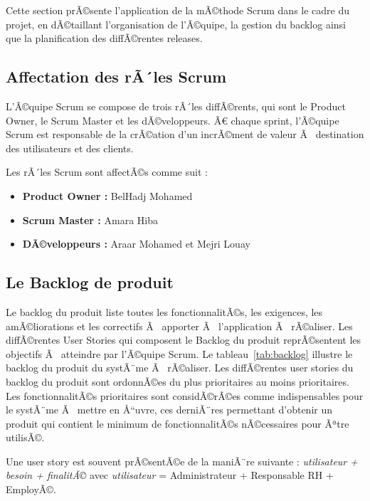 Cette section prÃ©sente l'application de la mÃ©thode Scrum dans le cadre du projet, en
dÃ©taillant l'organisation de l'Ã©quipe, la gestion du backlog ainsi que la planification
des diffÃ©rentes releases.

\subsection{Affectation des rÃ´les Scrum}

L'Ã©quipe Scrum se compose de trois rÃ´les diffÃ©rents, qui sont le Product Owner, le Scrum
Master et les dÃ©veloppeurs. Ã€ chaque sprint, l'Ã©quipe Scrum est responsable de la crÃ©ation
d'un incrÃ©ment de valeur Ã  destination des utilisateurs et des clients.

Les rÃ´les Scrum sont affectÃ©s comme suit :

\begin{itemize}
  \item \textbf{Product Owner :} BelHadj Mohamed
  \item \textbf{Scrum Master :} Amara Hiba
  \item \textbf{DÃ©veloppeurs :} Araar Mohamed et Mejri Louay
\end{itemize}

\subsection{Le Backlog de produit}

Le backlog du produit liste toutes les fonctionnalitÃ©s, les exigences, les amÃ©liorations et
les correctifs Ã  apporter Ã  l'application Ã  rÃ©aliser. Les diffÃ©rentes User Stories qui
composent le Backlog du produit reprÃ©sentent les objectifs Ã  atteindre par l'Ã©quipe Scrum.
Le tableau~\ref{tab:backlog} illustre le backlog du produit du systÃ¨me Ã  rÃ©aliser. Les
diffÃ©rentes user stories du backlog du produit sont ordonnÃ©es du plus prioritaires au moins
prioritaires. Les fonctionnalitÃ©s prioritaires sont considÃ©rÃ©es comme indispensables pour le
systÃ¨me Ã  mettre en Å“uvre, ces derniÃ¨res permettant d'obtenir un produit qui contient le
minimum de fonctionnalitÃ©s nÃ©cessaires pour Ãªtre utilisÃ©.

Une user story est souvent prÃ©sentÃ©e de la maniÃ¨re suivante :
\og{}\textit{utilisateur + besoin + finalitÃ©}\fg{} avec
\textit{utilisateur} = Administrateur + Responsable RH + EmployÃ©.

\renewcommand{\arraystretch}{1.5}

